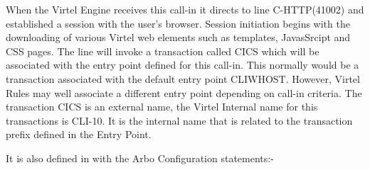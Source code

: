 \documentclass[letterpaper,10pt,english]{sphinxmanual}
\begin{document}
\begin{sphinxVerbatim}[commandchars=\\\{\}]
\end{sphinxVerbatim}

When the Virtel Engine receives this call-in it directs to line C-HTTP(41002) and established a session with the user’s browser. Session initiation begins with the downloading of various Virtel web elements such as templates, JavasSrcipt and CSS pages. The line will invoke a transaction called CICS which will be associated with the entry point defined for this call-in. This normally would be a transaction associated with the default entry point CLIWHOST. However, Virtel Rules may well associate a different entry point depending on call-in criteria. The transaction CICS is an external name, the Virtel Internal name for this transactions is CLI-10. It is the internal name that is related to the transaction prefix defined in the Entry Point.


It is also defined in with the Arbo Configuration statements:-

\begin{sphinxVerbatim}[commandchars=\\\{\}]
                                      
                                            
                                   
                                           
                                                 
                                         
                                              
\end{sphinxVerbatim}
\end{document}
